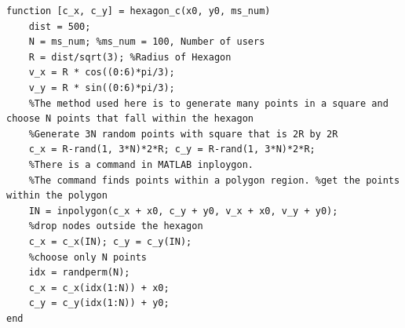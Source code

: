 \documentclass{article}
\begin{document}
\begin{lstlisting}[caption = {hexagon\_c.m}]
function [c_x, c_y] = hexagon_c(x0, y0, ms_num)
    dist = 500;
    N = ms_num; %ms_num = 100, Number of users
    R = dist/sqrt(3); %Radius of Hexagon
    v_x = R * cos((0:6)*pi/3);
    v_y = R * sin((0:6)*pi/3);
    %The method used here is to generate many points in a square and choose N points that fall within the hexagon
    %Generate 3N random points with square that is 2R by 2R
    c_x = R-rand(1, 3*N)*2*R; c_y = R-rand(1, 3*N)*2*R;
    %There is a command in MATLAB inploygon.
    %The command finds points within a polygon region. %get the points within the polygon
    IN = inpolygon(c_x + x0, c_y + y0, v_x + x0, v_y + y0);
    %drop nodes outside the hexagon
    c_x = c_x(IN); c_y = c_y(IN);
    %choose only N points
    idx = randperm(N);
    c_x = c_x(idx(1:N)) + x0;
    c_y = c_y(idx(1:N)) + y0;
end
\end{lstlisting}
\end{document}
